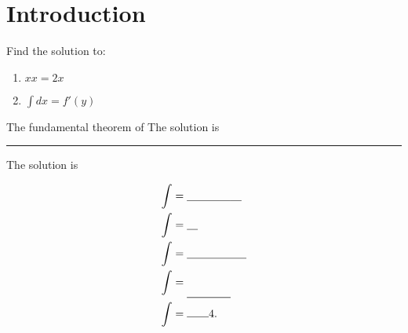 \documentclass{lecturenotes}
\begin{document}
\section{Introduction}
\begin{example}
Find the solution to: 
\begin{enumerate}
    \item $xx = 2x$
    \item $\int dx = f'(y)$
\end{enumerate}
\end{example}



\begin{theorem}
The fundamental theorem of 
The solution is \rule{4em}{0.1em} 
\end{theorem}


The solution is  


\begin{align*}
\int &=\underline{\quad\quad}\underline{\quad}\underline{\quad}\underline{\quad}\\
\int &=\underline{\quad}\\
\int &=\underline{\phantom{XXXXXX}}\\
\int &= \rule[-2.6ex]{4em}{0.5pt}\\
\int &= \bl{4}.
\end{align*}
\end{document}
